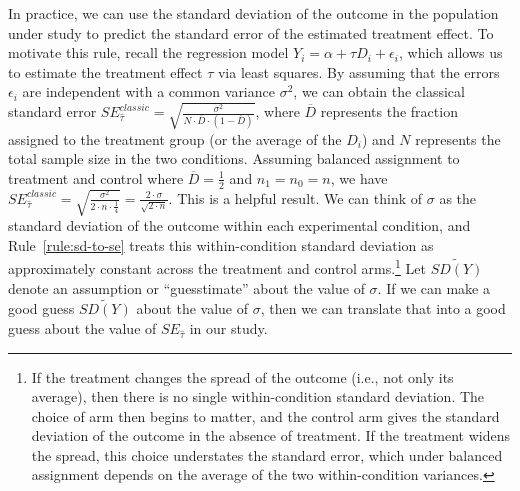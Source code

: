 \documentclass[12pt]{article}
\begin{document}
In practice, we can use the standard deviation of the outcome in the population under study to predict the standard error of the estimated treatment effect.
To motivate this rule, recall the regression model $Y_{i} = \alpha + \tau D_{i} + \epsilon_{i}$, which allows us to estimate the treatment effect $\tau$ via least squares.
By assuming that the errors $\epsilon_{i}$ are independent with a common variance $\sigma^{2}$, we can obtain the classical standard error $SE_{\widehat{\tau}}^{classic} = \sqrt{\frac{\sigma^{2}}{N \cdot \overline{D} \cdot \left( 1 - \overline{D} \right)}}$, where $\overline{D}$ represents the fraction assigned to the treatment group (or the average of the $D_{i}$) and $N$ represents the total sample size in the two conditions.
Assuming balanced assignment to treatment and control where $\overline{D} = \frac{1}{2}$ and $n_{1} = n_{0} = n$, we have $SE_{\widehat{\tau}}^{classic} = \sqrt{\frac{\sigma^{2}}{2 \cdot n \cdot \frac{1}{4}}} = \frac{2 \cdot \sigma}{\sqrt{2 \cdot n}}$.
This is a helpful result.
We can think of $\sigma$ as the standard deviation of the outcome within each experimental condition, and Rule~\ref{rule:sd-to-se} treats this within-condition standard deviation as approximately constant across the treatment and control arms.\footnote{
  If the treatment changes the spread of the outcome (i.e., not only its average), then there is no single within-condition standard deviation. The choice of arm then begins to matter, and the control arm gives the standard deviation of the outcome in the absence of treatment. If the treatment widens the spread, this choice understates the standard error, which under balanced assignment depends on the average of the two within-condition variances.
  }
Let $\widetilde{SD(Y)}$ denote an assumption or ``guesstimate'' about the value of $\sigma$.
If we can make a good guess $\widetilde{SD(Y)}$ about the value of $\sigma$, then we can translate that into a good guess about the value of $SE_{\widehat{\tau}}$ in our study.
\end{document}
